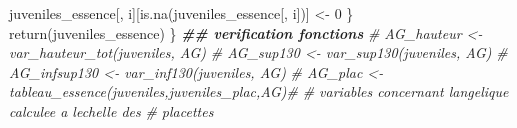 \documentclass[
  12pt,
  american,
  a4paper,
  extrafontsizes,onecolumn,openright
  ]{memoir}
\newenvironment{Shaded}{\begin{snugshade}}{\end{snugshade}}
\newcommand{\CommentTok}[1]{\textcolor[rgb]{0.56,0.35,0.01}{\textit{#1}}}
\newcommand{\DecValTok}[1]{\textcolor[rgb]{0.00,0.00,0.81}{#1}}
\newcommand{\DocumentationTok}[1]{\textcolor[rgb]{0.56,0.35,0.01}{\textbf{\textit{#1}}}}
\newcommand{\FunctionTok}[1]{\textcolor[rgb]{0.00,0.00,0.00}{#1}}
\newcommand{\NormalTok}[1]{#1}
\newcommand{\OtherTok}[1]{\textcolor[rgb]{0.56,0.35,0.01}{#1}}
\begin{document}
\begin{Shaded}
\begin{Highlighting}[]
\NormalTok{        juveniles\_essence[, i][}\FunctionTok{is.na}\NormalTok{(juveniles\_essence[, i])] }\OtherTok{\textless{}{-}} \DecValTok{0}
\NormalTok{    \}}
    \FunctionTok{return}\NormalTok{(juveniles\_essence)}
\NormalTok{\}}
\DocumentationTok{\#\# verification fonctions}
\CommentTok{\# AG\_hauteur \textless{}{-} var\_hauteur\_tot(juveniles, \textquotesingle{}AG\textquotesingle{})}
\CommentTok{\# AG\_sup130 \textless{}{-} var\_sup130(juveniles, \textquotesingle{}AG\textquotesingle{})}
\CommentTok{\# AG\_infsup130 \textless{}{-} var\_inf130(juveniles, \textquotesingle{}AG\textquotesingle{})}
\CommentTok{\# AG\_plac \textless{}{-}tableau\_essence(juveniles,juveniles\_plac,\textquotesingle{}AG\textquotesingle{})\#}
\CommentTok{\# variables concernant l\textquotesingle{}angelique calculee a l\textquotesingle{}echelle des}
\CommentTok{\# placettes}
\end{Highlighting}
\end{Shaded}

\normalsize

\scriptsize
\end{document}
